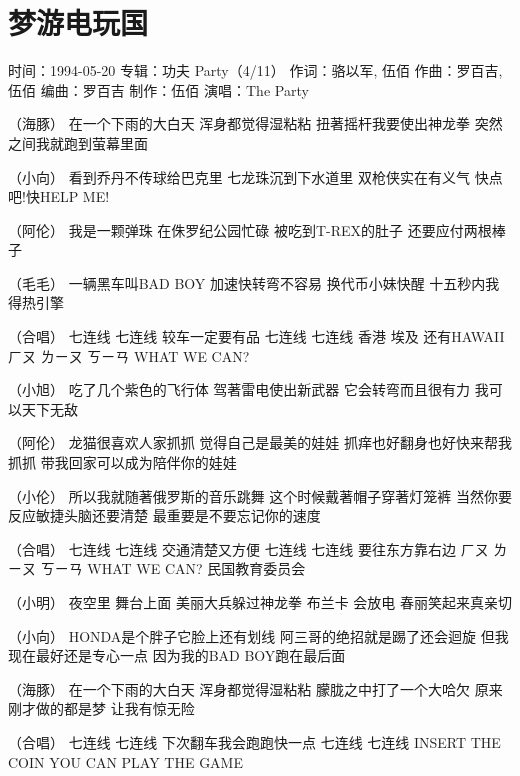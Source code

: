 \documentclass[UTF8,a4paper,oneside,twocolumn,12pt]{ctexbook}
\newcommand{\infopair}[2]{\textbullet #1：#2}
\newcommand{\zc}[1][伍佰]{\infopair{作词}{#1}}
\newcommand{\zq}[1][伍佰]{\infopair{作曲}{#1}}
\newcommand{\bq}[1][伍佰]{\infopair{编曲}{#1}}
\newcommand{\zj}[1]{\infopair{专辑}{#1}}
\newcommand{\zz}[1]{\infopair{制作}{#1}}
\newcommand{\sj}[1]{\infopair{时间}{#1}}
\newenvironment{info}{\begin{flushleft}\kaishu
	}
	{\end{flushleft}\normalsize\yahei\par}
\newenvironment{lyric}{
	}
{}
\begin{document}
\section{梦游电玩国}
\begin{info}
	\sj{1994-05-20}
	\zj{功夫 Party（4/11）}
	\zc[骆以军, 伍佰]
	\zq[罗百吉, 伍佰]
	\bq[罗百吉]
	\zz{伍佰}
	\infopair{演唱}{The Party}
\end{info}
\begin{lyric}
	（海豚）
	在一个下雨的大白天 浑身都觉得湿粘粘
	扭著摇杆我要使出神龙拳
	突然之间我就跑到萤幕里面

	（小向）
	看到乔丹不传球给巴克里 七龙珠沉到下水道里
	双枪侠实在有义气 快点吧!快HELP ME!

	（阿伦）
	我是一颗弹珠 在侏罗纪公园忙碌
	被吃到T-REX的肚子 还要应付两根棒子

	（毛毛）
	一辆黑车叫BAD BOY 加速快转弯不容易
	换代币小妹快醒 十五秒内我得热引擎

	（合唱）
	七连线 七连线 较车一定要有品
	七连线 七连线 香港 埃及 还有HAWAII
	ㄏㄡ ㄌㄧㄡ ㄎㄧㄢ WHAT WE CAN?

	（小旭）
	吃了几个紫色的飞行体 驾著雷电使出新武器
	它会转弯而且很有力 我可以天下无敌

	（阿伦）
	龙猫很喜欢人家抓抓 觉得自己是最美的娃娃
	抓痒也好翻身也好快来帮我抓抓
	带我回家可以成为陪伴你的娃娃

	（小伦）
	所以我就随著俄罗斯的音乐跳舞
	这个时候戴著帽子穿著灯笼裤
	当然你要反应敏捷头脑还要清楚
	最重要是不要忘记你的速度

	（合唱）
	七连线 七连线 交通清楚又方便
	七连线 七连线 要往东方靠右边
	ㄏㄡ ㄌㄧㄡ ㄎㄧㄢ WHAT WE CAN?
	民国教育委员会

	（小明）
	夜空里 舞台上面 美丽大兵躲过神龙拳
	布兰卡 会放电 春丽笑起来真亲切

	（小向）
	HONDA是个胖子它脸上还有划线
	阿三哥的绝招就是踢了还会迴旋
	但我现在最好还是专心一点 因为我的BAD BOY跑在最后面

	（海豚）
	在一个下雨的大白天 浑身都觉得湿粘粘
	朦胧之中打了一个大哈欠 原来刚才做的都是梦
	让我有惊无险

	（合唱）
	七连线 七连线 下次翻车我会跑跑快一点
	七连线 七连线
	INSERT THE COIN YOU CAN PLAY THE GAME
\end{lyric}
\end{document}
